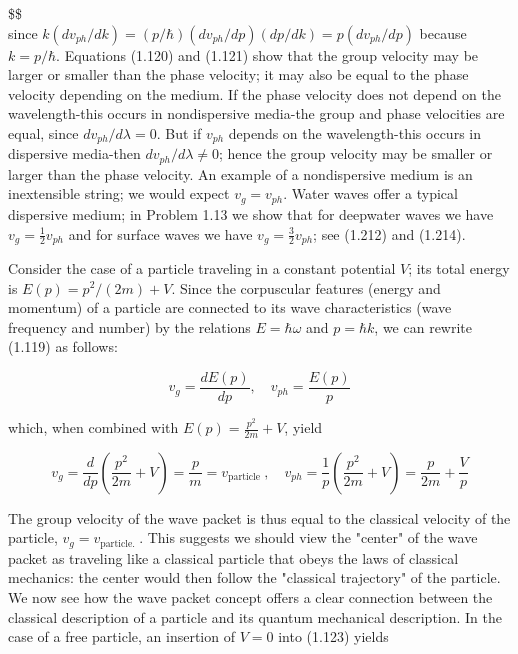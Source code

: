 \documentclass[10pt]{article}
\begin{document}
\$\$\\
since $k\left(d v_{p h} / d k\right)=(p / \hbar)\left(d v_{p h} / d p\right)(d p / d k)=p\left(d v_{p h} / d p\right)$ because $k=p / \hbar$. Equations (1.120) and (1.121) show that the group velocity may be larger or smaller than the phase velocity; it may also be equal to the phase velocity depending on the medium. If the phase velocity does not depend on the wavelength-this occurs in nondispersive media-the group and phase velocities are equal, since $d v_{p h} / d \lambda=0$. But if $v_{p h}$ depends on the wavelength-this occurs in dispersive media-then $d v_{p h} / d \lambda \neq 0$; hence the group velocity may be smaller or larger than the phase velocity. An example of a nondispersive medium is an inextensible string; we would expect $v_{g}=v_{p h}$. Water waves offer a typical dispersive medium; in Problem 1.13 we show that for deepwater waves we have $v_{g}=\frac{1}{2} v_{p h}$ and for surface waves we have $v_{g}=\frac{3}{2} v_{p h}$; see (1.212) and (1.214).

Consider the case of a particle traveling in a constant potential $V$; its total energy is $E(p)=p^{2} /(2 m)+V$. Since the corpuscular features (energy and momentum) of a particle are connected to its wave characteristics (wave frequency and number) by the relations $E=\hbar \omega$ and $p=\hbar k$, we can rewrite (1.119) as follows:


\begin{equation*}
v_{g}=\frac{d E(p)}{d p}, \quad v_{p h}=\frac{E(p)}{p} \tag{1.122}
\end{equation*}


which, when combined with $E(p)=\frac{p^{2}}{2 m}+V$, yield


\begin{equation*}
v_{g}=\frac{d}{d p}\left(\frac{p^{2}}{2 m}+V\right)=\frac{p}{m}=v_{\text {particle }}, \quad v_{p h}=\frac{1}{p}\left(\frac{p^{2}}{2 m}+V\right)=\frac{p}{2 m}+\frac{V}{p} \tag{1.123}
\end{equation*}


The group velocity of the wave packet is thus equal to the classical velocity of the particle, $v_{g}=v_{\text {particle. }}$. This suggests we should view the "center" of the wave packet as traveling like a classical particle that obeys the laws of classical mechanics: the center would then follow the "classical trajectory" of the particle. We now see how the wave packet concept offers a clear connection between the classical description of a particle and its quantum mechanical description. In the case of a free particle, an insertion of $V=0$ into (1.123) yields
\end{document}
